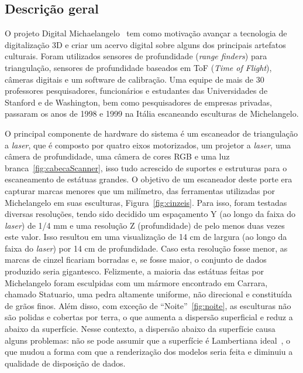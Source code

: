 \subsection*{Descrição geral}

O projeto Digital Michaelangelo~\cite{levoy2000digital} tem como motivação
avançar a tecnologia de digitalização 3D e criar um acervo digital sobre alguns
dos principais artefatos culturais. Foram
utilizados sensores de profundidade (\emph{range finders}) para triangulação,
sensores de profundidade baseados em ToF (\emph{Time of Flight}), câmeras digitais e
um software de calibração. Uma equipe de mais de 30 professores pesquisadores,
funcionários e estudantes das Universidades de Stanford e de Washington, bem como pesquisadores de 
empresas privadas, passaram os anos de 1998 e
1999 na Itália escaneando esculturas de Michelangelo. 

O principal componente de hardware do sistema é um escaneador de triangulação a
\emph{laser}, que é composto por quatro eixos motorizados, um projetor a \emph{laser}, uma
câmera de profundidade, uma câmera de cores RGB e uma luz
branca~\ref{fig:cabecaScanner}, isso tudo acrescido de suportes e estruturas
para o escaneamento de estátuas grandes. O objetivo de um escaneador deste
porte era capturar marcas menores que um milímetro, das ferramentas utilizadas
por Michelangelo em suas esculturas, Figura~\ref{fig:cinzeis}.  Para isso, foram testadas diversas
resoluções, tendo sido decidido um espaçamento Y (ao longo da faixa do
\emph{laser}) de 1/4 mm e uma resolução Z (profundidade) de pelo menos duas
vezes este valor. Isso resultou em uma visualização de 14 cm de largura (ao
longo da faixa do \emph{laser}) por 14 cm de profundidade. Caso esta resolução
fosse menor, as marcas de cinzel ficariam borradas e, se fosse maior, o
conjunto de dados produzido seria gigantesco.  Felizmente, a maioria das
estátuas feitas por Michelangelo foram esculpidas com um mármore encontrado em
Carrara, chamado Statuario, uma pedra altamente uniforme, não direcional e constituída
de grãos finos. Além disso, com exceção de ``Noite''~\ref{fig:noite}, as
esculturas não são polidas e cobertas por terra, o que aumenta a dispersão
superficial e reduz a abaixo da superfície.  Nesse contexto, a dispersão abaixo
da superfície causa alguns problemas: não se pode assumir que a superfície é
Lambertiana ideal~\cite{basri2003lambertian}, o que mudou a forma com que a
renderização dos modelos seria feita e diminuiu a qualidade de disposição de
dados.

